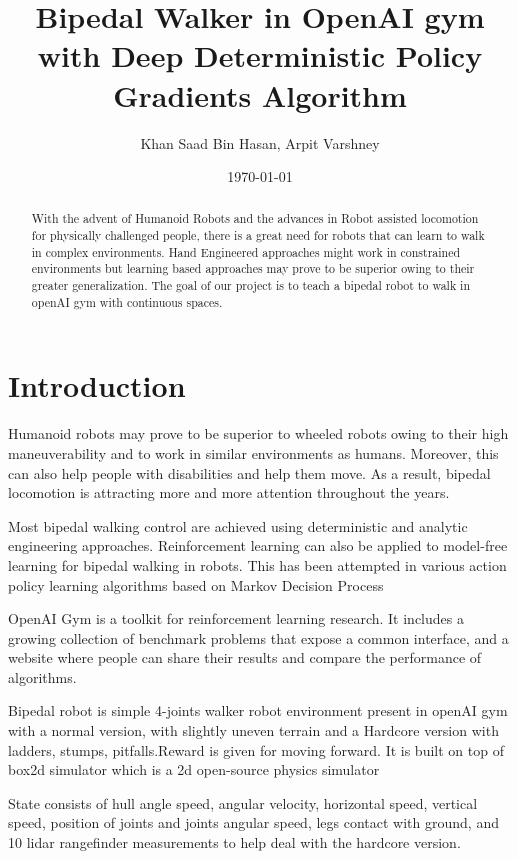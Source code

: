 \documentclass[a4paper]{article}
\title{Bipedal Walker in OpenAI gym with Deep Deterministic Policy Gradients Algorithm}
\author{Khan Saad Bin Hasan, Arpit Varshney}
\date{\today} %
\begin{document}
\maketitle

\begin{abstract}
With the advent of Humanoid Robots and the advances in Robot assisted locomotion for physically challenged people, there is a great need for robots that can learn to walk in complex environments. Hand Engineered approaches might work in constrained environments but learning based approaches may prove to be superior owing to their greater generalization. The goal of our project is to teach a bipedal robot to walk in openAI gym with continuous spaces. 
\end{abstract}

\section*{Introduction}

Humanoid robots may prove to be superior to wheeled robots owing to their high maneuverability and to work in similar environments as humans. Moreover, this can also help people with disabilities and help them move. As a result, bipedal locomotion is attracting more and more attention throughout the years.\cite{song2017recurrent}

Most bipedal walking control are achieved using deterministic and analytic engineering approaches. Reinforcement learning can also be applied to model-free learning for bipedal walking in robots. This has been attempted in various action policy learning algorithms based on Markov Decision Process\cite{song2017recurrent}

OpenAI Gym is a toolkit for reinforcement learning research. It includes a growing collection of benchmark problems that expose a common interface, and a website where people can share their results and compare the performance of algorithms.\cite{brockman2016openai}

Bipedal robot is simple 4-joints walker robot environment present in openAI gym with a normal version, with slightly uneven terrain and a Hardcore version with ladders, stumps, pitfalls.Reward is given for moving forward. It is built on top of box2d simulator which is  a 2d open-source physics simulator\cite{catto2011box2d}

State consists of hull angle speed, angular velocity, horizontal speed, vertical speed, position of joints and joints angular speed, legs contact with ground, and 10 lidar rangefinder measurements to help deal with the hardcore version.\cite{bipedalsource:2019}
\end{document}
